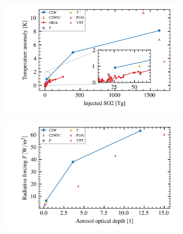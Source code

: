 \documentclass{ametsocV5}
\begin{document}
\begin{figure}
  \begin{subfigure}{0.5\linewidth}
    \centering
    \includegraphics[width=0.95\linewidth]{figures/injection_vs_temperature.png}
    \caption{}%
    \label{fig:so2_vs_temp}
  \end{subfigure}
  \begin{subfigure}{0.5\linewidth}
    \centering
    \includegraphics[width=0.95\linewidth]{./figures/aod_vs_toa.png}
    \caption{}%
    \label{fig:aod_vs_toa}
  \end{subfigure}


\end{figure}
\end{document}
